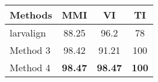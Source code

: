 \begin{tabular}{lccc}
\hline
 ﻿Methods  & MMI   & VI    & TI  \\ \hline \hline
 larvalign & 88.25 & 96.2  & 78  \\
 Method 3  & 98.42 & 91.21 & 100 \\
 Method 4  & \textbf{98.47} & \textbf{98.47} & \textbf{100} \\
\hline
\end{tabular}